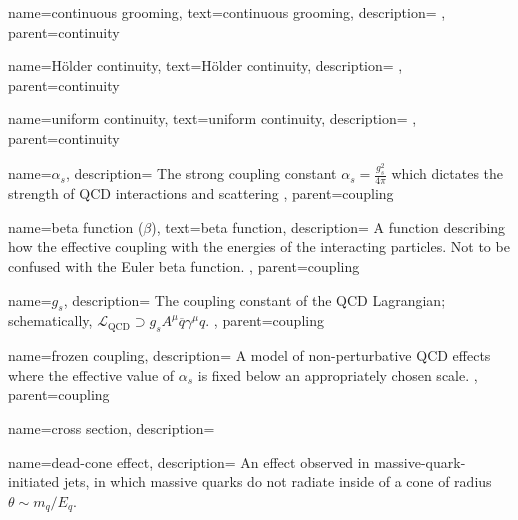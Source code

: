     {
        name=continuous grooming,
        text=continuous grooming,
        description={
        },
        parent=continuity
    }


    {
        name=H\"older continuity,
        text=H\"older continuity,
        description={
        },
        parent=continuity
    }


    {
        name=uniform continuity,
        text=uniform continuity,
        description={
        },
        parent=continuity
    }



    {
      name=\ensuremath{\alpha_s},
      description={
          The strong coupling constant \(\alpha_s = \frac{g_s^2}{4\pi}\) which dictates the strength of QCD interactions and scattering
    },
    parent=coupling
    }

    {
        name=beta function (\ensuremath{\beta}),
        text=beta function,
        description={%
            A function describing how the effective coupling with the energies of the interacting particles.
            Not to be confused with the Euler beta function.
        },
        parent=coupling
    }

    {
      name=\ensuremath{g_s},
      description={
          The coupling constant of the QCD Lagrangian;
          schematically, \(\mathcal{L}_\text{QCD} \supset g_s A^\mu \overline{q} \gamma^\mu q\).
      },
      parent=coupling
    }


    {
      name=frozen coupling,
      description={
          A model of non-perturbative QCD effects where the effective value of \(\alpha_s\) is fixed below an appropriately chosen scale.
      },
      parent=coupling
    }




{
    name=cross section,
    description={
    }
}


{
    name=dead-cone effect,
    description={
        An effect observed in massive-quark-initiated jets, in which massive quarks do not radiate inside of a cone of radius \(\theta \sim m_q/E_q\).
    }
}


